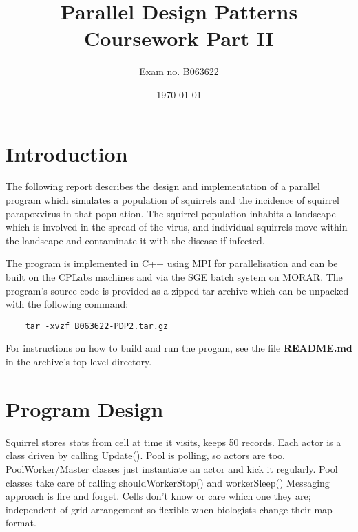 \documentclass[11pt, oneside]{article}   %
\title{Parallel Design Patterns Coursework Part II}
\author{Exam no. B063622}
\date{\today}
\begin{document}
\maketitle

\newpage

\tableofcontents

\newpage


\section{Introduction}

The following report describes the design and implementation of a parallel program which simulates a population of squirrels and the incidence of squirrel parapoxvirus in that population.
The squirrel population inhabits a landscape which is involved in the spread of the virus, and individual squirrels move within the landscape and contaminate it with the disease if infected.

The program is implemented in C++ using MPI for parallelisation and can be built on the CPLabs machines and via the SGE batch system on MORAR.
The program's source code is provided as a zipped tar archive which can be unpacked with the following command:

\begin{lstlisting}
	tar -xvzf B063622-PDP2.tar.gz
\end{lstlisting}

For instructions on how to build and run the progam, see the file \textbf{README.md} in the archive's top-level directory.

\newpage

\section{Program Design}
Squirrel stores stats from cell at time it visits, keeps 50 records.
Each actor is a class driven by calling Update().
Pool is polling, so actors are too.
PoolWorker/Master classes just instantiate an actor and kick it regularly.
Pool classes take care of calling shouldWorkerStop() and workerSleep()
Messaging approach is fire and forget.
Cells don't know or care which one they are; independent of grid arrangement so flexible when biologists change their map format.
\end{document}

